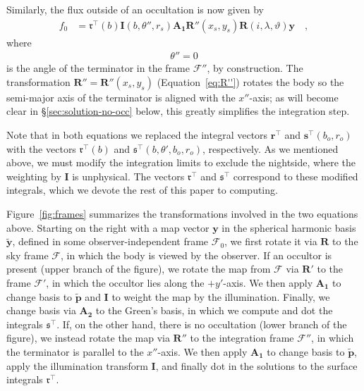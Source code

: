 \documentclass[modern]{aastex62}
\newcommand{\BF}[1]{\ensuremath{\mathbf{#1}}}
\newcommand{\sT}{\ensuremath{\mathfrak{s}^\top}}
\newcommand{\rT}{\ensuremath{\mathfrak{r}^\top}}
\newcommand{\sTe}{\ensuremath{\BF{s}^\top}}
\newcommand{\rTe}{\ensuremath{\BF{r}^\top}}
\newcommand{\bp}{\ensuremath{\tilde{\BF{p}}}}
\newcommand{\by}{\ensuremath{\tilde{\BF{y}}}}
\begin{document}
Similarly, the flux outside of an occultation is now given by
%
\begin{align}
    \label{eq:rTIA1RRy}
    f_0 & =
    \mathfrak{r}^\top(b)
    \BF{I}(b, \theta'', r_s)
    \BF{A_1}
    \BF{R}''(x_s, y_s)
    \BF{R}(i, \lambda, \vartheta)
    \BF{y}
    \quad,
\end{align}
%
where
%
\begin{align}
    \label{eq:theta''}
    \theta'' = 0
\end{align}
%
is the angle of the terminator in the frame $\mathcal{F}''$, by
construction. The transformation
$\BF{R}'' = \BF{R}''(x_s, y_s)$ (Equation~\ref{eq:R''}) rotates
the body so the semi-major axis of the terminator is aligned
with the $x''$-axis; as will become clear in \S\ref{sec:solution-no-occ} below,
this greatly simplifies the integration step.

Note that in both equations we replaced the integral vectors
$\rTe$ and $\sTe(b_o, r_o)$
with the vectors
$\mathfrak{r}^\top(b)$ and $\mathfrak{s}^\top(b, \theta', b_o, r_o)$,
respectively.
As we mentioned above, we must modify the integration limits to exclude the
nightside, where the weighting by $\BF{I}$ is unphysical.
The vectors $\mathfrak{r}^\top$ and $\mathfrak{s}^\top$ correspond to these
modified integrals, which we devote the rest of this paper to
computing.

Figure~\ref{fig:frames} summarizes the transformations involved in the two
equations above. Starting on the right with a map vector $\BF{y}$ in
the spherical harmonic basis $\by$, defined in some observer-independent frame
$\mathcal{F}_0$, we first rotate it via $\BF{R}$ to the sky frame
$\mathcal{F}$, in which the body is viewed by the
observer. If an occultor is present (upper branch of the figure),
we rotate the map from $\mathcal{F}$ via $\BF{R}'$ to the frame
$\mathcal{F}'$, in which the occultor lies along the
$+y'$-axis. We then apply $\BF{A_1}$ to change basis to $\bp$ and $\BF{I}$
to weight the map by the illumination. Finally, we change basis
via $\BF{A_2}$ to the Green's basis, in which we compute and dot the
integrals $\sT$.
If, on the other hand, there is no occultation (lower branch of the figure),
we instead rotate the map via $\BF{R}''$ to the integration frame
$\mathcal{F}''$, in which the terminator is parallel to the
$x''$-axis. We then apply $\BF{A_1}$ to change basis to $\bp$, apply the
illumination transform $\BF{I}$, and finally dot in the solutions to the
surface integrals $\rT$.

%
\end{document}
